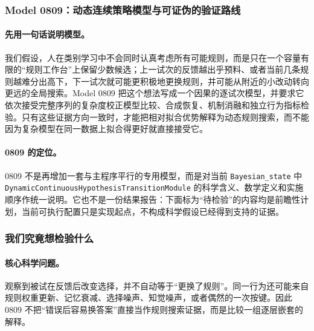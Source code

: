 
\subsubsection{Model 0809：动态连续策略模型与可证伪的验证路线}

\paragraph{先用一句话说明模型。}
我们假设，人在类别学习中不会同时认真考虑所有可能规则，而是只在一个容量有限的“规则工作台”上保留少数候选；上一试次的反馈越出乎预料、或者当前几条规则越难分出高下，下一试次就可能更积极地更换规则，并可能从附近的小改动转向更远的全局搜索。Model 0809 把这个想法写成一个因果的逐试次模型，并要求它依次接受完整序列的复杂度校正模型比较、合成恢复、机制消融和独立行为指标检验。只有这些证据方向一致时，才能把相对拟合优势解释为动态规则搜索，而不能因为复杂模型在同一数据上拟合得更好就直接接受它。

\paragraph{0809 的定位。}
0809 不是再增加一套与主程序平行的专用模型，而是对当前
\texttt{Bayesian\_state} 中
\texttt{DynamicContinuousHypothesisTransitionModule} 的科学含义、数学定义和实施顺序作统一说明。它也不是一份结果报告：下面标为“待检验”的内容均是前瞻性计划，当前可执行配置只是实现起点，不构成科学假设已经得到支持的证据。


\subsubsection{我们究竟想检验什么}

\paragraph{核心科学问题。}
观察到被试在反馈后改变选择，并不自动等于“更换了规则”。同一行为还可能来自规则权重更新、记忆衰减、选择噪声、知觉噪声，或者偶然的一次按键。因此 0809 不把“错误后容易换答案”直接当作规则搜索证据，而是比较一组逐层嵌套的解释。

